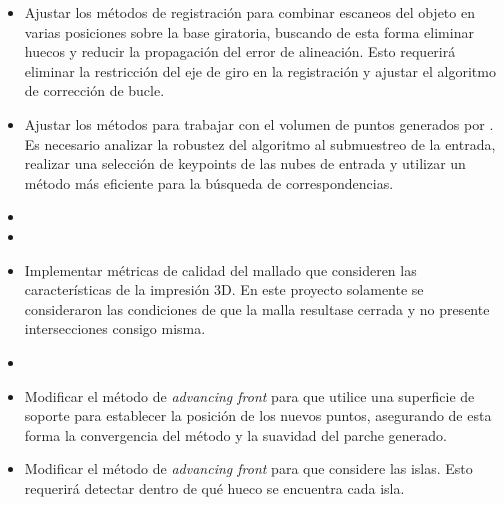 \begin{itemize}
	\item Ajustar los métodos de registración para combinar escaneos del objeto
		en varias posiciones sobre la base giratoria,
		buscando de esta forma eliminar huecos y reducir la propagación del error de alineación.
		Esto requerirá eliminar la restricción del eje de giro en la registración
		y ajustar el algoritmo de corrección de bucle.
	\item Ajustar los métodos para trabajar con el volumen de puntos generados
		por \cite{Pancho}.
		Es necesario analizar la robustez del algoritmo al submuestreo de la entrada,
		realizar una selección de keypoints de las nubes de entrada
		y utilizar un método más eficiente para la búsqueda de correspondencias.
	\item {}
	\item {}
	\item Implementar métricas de calidad del mallado que consideren las
		características de la impresión 3D.
		En este proyecto solamente se consideraron las condiciones de que la malla
		resultase cerrada y no presente intersecciones consigo misma.
	\item {}
	\item Modificar el método de \emph{advancing front} para que utilice una
		superficie de soporte para establecer la posición de los nuevos puntos,
		asegurando de esta forma la convergencia del método y la suavidad del
		parche generado.
	\item Modificar el método de \emph{advancing front} para que considere las islas.
		Esto requerirá detectar dentro de qué hueco se encuentra cada isla.
\end{itemize}

